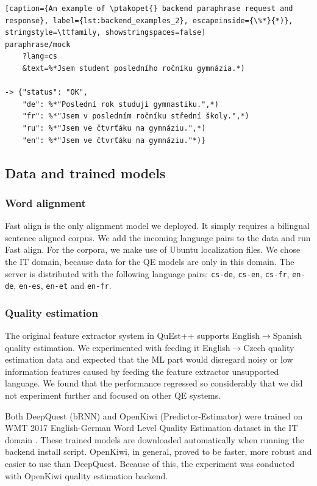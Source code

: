 \begin{lstlisting}[caption={An example of \ptakopet{} backend paraphrase request and response}, label={lst:backend_examples_2}, escapeinside={\%*}{*)}, stringstyle=\ttfamily, showstringspaces=false]
paraphrase/mock
    ?lang=cs
    &text=%*Jsem student posledního ročníku gymnázia.*)
    
-> {"status": "OK",
    "de": %*"Poslední rok studuji gymnastiku.",*)
    "fr": %*"Jsem v posledním ročníku střední školy.",*)
    "ru": %*"Jsem ve čtvrťáku na gymnáziu.",*)
    "en": %*"Jsem ve čtvrťáku na gymnáziu."*)}
\end{lstlisting}


\subsection{Data and trained models}

\subsubsection{Word alignment}

Fast align is the only alignment model we deployed. It simply requires a bilingual sentence aligned corpus. We add the incoming language pairs to the data and run Fast align. For the corpora, we make use of Ubuntu localization files. We chose the IT domain, because data for the QE models are only in this domain. The server is distributed with the following language pairs: \texttt{cs-de}, \texttt{cs-en}, \texttt{cs-fr}, \texttt{en-de}, \texttt{en-es}, \texttt{en-et} and \texttt{en-fr}.

\subsubsection{Quality estimation}

The original feature extractor system in QuEst++ supports English$\rightarrow$Spanish quality estimation. We experimented with feeding it English$\rightarrow$Czech quality estimation data and expected that the ML part would disregard noisy or low information features caused by feeding the feature extractor unsupported language. We found that the performance regressed so considerably that we did not experiment further and focused on other QE systems.

Both DeepQuest (bRNN) and OpenKiwi (Predictor-Estimator) were trained on WMT 2017 English-German Word Level Quality Estimation dataset in the IT domain \citep{WMT17}. These trained models are downloaded automatically when running the backend install script. 
OpenKiwi, in general, proved to be faster, more robust and easier to use than DeepQuest. Because of this, the experiment was conducted with OpenKiwi quality estimation backend.

